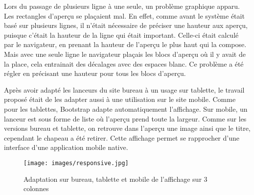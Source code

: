 \documentclass[12pt,a4paper]{article}
\begin{document}
\medskip
Lors du passage de plusieurs ligne à une seule, un problème graphique apparu. Les rectangles d'aperçu se plaçaient mal. En effet, comme avant le système était basé sur plusieurs lignes, il n'était nécessaire de préciser une hauteur aux aperçu, puisque c'était la hauteur de la ligne qui était important. Celle-ci était calculé par le navigateur, en prenant la hauteur de l'aperçu le plus haut qui la compose. Mais avec une seule ligne le navigateur plaçais les blocs d'aperçu où il y avait de la place, cela entrainait des décalages avec des espaces blanc. Ce problème a été régler en précisant une hauteur pour tous les blocs d'aperçu.\par 
\bigskip
Après avoir adapté les lanceurs du site bureau à un usage sur tablette, le travail proposé était de les adapter aussi à une utilisation sur le site mobile. Comme pour les tablettes, Bootstrap adapte automatiquement l'affichage. Sur mobile, un lanceur est sous forme de liste où l'aperçu prend toute la largeur. Comme sur les versions bureau et tablette, on retrouve dans l'aperçu une image ainsi que le titre, cependant le chapeau a été retirer. Cette affichage permet se rapprocher d'une interface d'une application mobile native.\par

\begin{figure}[h!]
\centering\texttt{[image: images/responsive.jpg]} 
\caption{Adaptation sur bureau, tablette et mobile de l'affichage sur 3 colonnes}
\end{figure}
\newpage
\end{document}
